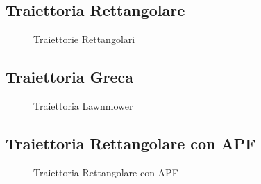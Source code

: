 \label{sec:res}

\subsection{Traiettoria Rettangolare}

\begin{figure} [H]
    \centering
    
    \caption{Traiettorie Rettangolari}
    \label{fig:rect}
\end{figure} 

\subsection{Traiettoria Greca}

\begin{figure} [H]
    \centering
    
    \caption{Traiettoria Lawnmower}
    \label{fig:greca}
\end{figure} 


\subsection{Traiettoria Rettangolare con APF}

\begin{figure} [H]
    \centering
    
    \caption{Traiettoria Rettangolare con APF}
    \label{fig:rectAPF}
\end{figure} 
